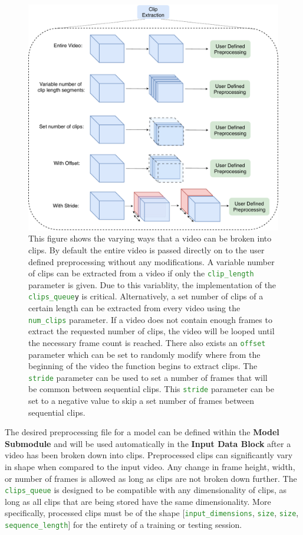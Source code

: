 \documentclass{llncs}
\begin{document}
\begin{figure}[b!]
\centering
\includegraphics[width=0.8\columnwidth]{images/extract_clips.pdf}
\caption{This figure shows the varying ways that a video can be broken into clips.
By default the entire video is passed directly on to the user defined preprocessing without any modifications.
A variable number of clips can be extracted from a video if only the \texttt{\textcolor{ForestGreen}{clip\_length}} parameter is given.
Due to this variablity, the implementation of the \texttt{\textcolor{ForestGreen}{clips\_queue}y} is critical.
Alternatively, a set number of clips of a certain length can be extracted from every video using the \texttt{\textcolor{ForestGreen}{num\_clips}} parameter.
If a video does not contain enough frames to extract the requested number of clips, the video will be looped until the necessary frame count is reached.
There also exists an \texttt{\textcolor{ForestGreen}{offset}} parameter which can be set to randomly modify where from the beginning of the video the function begins to extract clips. 
The \texttt{\textcolor{ForestGreen}{stride}}  parameter can be used to set a number of frames that will be common between sequential clips.
This \texttt{\textcolor{ForestGreen}{stride}} parameter can be set to a negative value to skip a set number of frames between sequential clips.
}
\label{fig:extract_clips}
\end{figure}


The desired preprocessing file for a model can be defined within the \textbf{Model Submodule} and will be used automatically in the \textbf{Input Data Block} after a video has been broken down into clips.
Preprocessed clips can significantly vary in shape when compared to the input video.
Any change in frame height, width, or number of frames is allowed as long as clips are not broken down further.
The \texttt{\textcolor{ForestGreen}{clips\_queue}} is designed to be compatible with any dimensionality of clips, as long as all clips that are being stored have the same dimensionality.
More specifically, processed clips must be of the shape [\texttt{\textcolor{ForestGreen}{input\_dimensions}}, \texttt{\textcolor{ForestGreen}{size}}, \texttt{\textcolor{ForestGreen}{size}}, \texttt{\textcolor{ForestGreen}{sequence\_length}}] for the entirety of a training or testing session.
\end{document}
